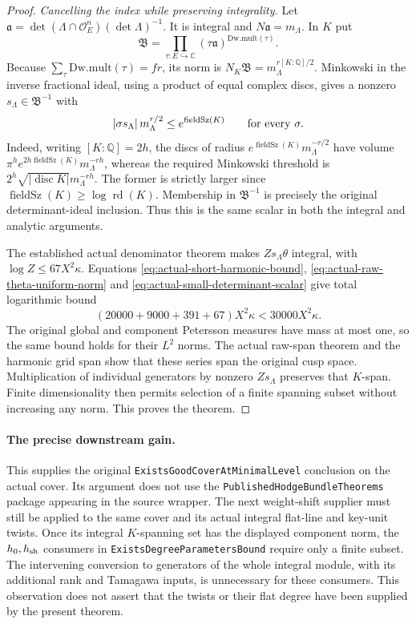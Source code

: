 \begin{proof}
\emph{Cancelling the index while preserving integrality.}
Let $\mathfrak a=\det(\Lambda\cap\mathcal O_E^n)(\det\Lambda)^{-1}$.
It is integral and $N\mathfrak a=m_\Lambda$.  In $K$ put
\[
 \mathfrak B=\prod_{\tau:E\hookrightarrow\mathbb C}
                 (\tau\mathfrak a)^{\mathrm{Dw.mult}(\tau)}.
\]
Because $\sum_\tau\mathrm{Dw.mult}(\tau)=fr$, its norm is
$N_K\mathfrak B=m_\Lambda^{r[K:\mathbb Q]/2}$.
Minkowski in the inverse fractional ideal, using a product of equal
complex discs, gives a nonzero $s_\Lambda\in\mathfrak B^{-1}$ with
\begin{equation}\label{eq:actual-small-determinant-scalar}
        |\sigma s_\Lambda|\,m_\Lambda^{r/2}
                  \le e^{\operatorname{fieldSz}(K)}
                  \qquad\hbox{for every }\sigma.
\end{equation}
Indeed, writing $[K:\mathbb Q]=2h$, the discs of radius
$e^{\operatorname{fieldSz}(K)}m_\Lambda^{-r/2}$ have volume
$\pi^h e^{2h\operatorname{fieldSz}(K)}m_\Lambda^{-rh}$,
whereas the required Minkowski threshold is
$2^h\sqrt{|\operatorname{disc}K|}m_\Lambda^{-rh}$.
The former is strictly larger since
$\operatorname{fieldSz}(K)\ge\log\operatorname{rd}(K)$.
Membership in $\mathfrak B^{-1}$ is precisely the original
determinant-ideal inclusion.  Thus this is the same scalar in both
the integral and analytic arguments.

The established actual denominator theorem\cite{current-construction-record} makes
$Zs_\Lambda\theta$ integral, with $\log Z\le67X^2\kappa$.
Equations \eqref{eq:actual-short-harmonic-bound},
\eqref{eq:actual-raw-theta-uniform-norm} and
\eqref{eq:actual-small-determinant-scalar} give total logarithmic
bound
\[
        (20000+9000+391+67)X^2\kappa<30000X^2\kappa.
\]
The original global and component Petersson measures have mass at
most one, so the same bound holds for their $L^2$ norms.  The actual
raw-span theorem and the harmonic grid span show that these series
span the original cusp space.  Multiplication of individual generators
by nonzero $Zs_\Lambda$ preserves that $K$-span.  Finite dimensionality
then permits selection of a finite spanning subset without increasing
any norm.  This proves the theorem.
\end{proof}

\paragraph{The precise downstream gain.}
This supplies the original \texttt{ExistsGoodCoverAtMinimalLevel}
conclusion on the actual cover.  Its argument does not use the
\texttt{PublishedHodgeBundleTheorems} package appearing in the source
wrapper.  The next weight-shift supplier must still be applied to the
same cover and its actual integral flat-line and key-unit twists.
Once its integral $K$-spanning set has the displayed component norm,
the $h_0,h_{\rm sh}$ consumers in
\texttt{ExistsDegreeParametersBound} require only a finite subset.
The intervening conversion to generators of the whole integral module,
with its additional rank and Tamagawa inputs, is unnecessary for these
consumers.  This observation does not assert that the twists or their
flat degree have been supplied by the present theorem.
